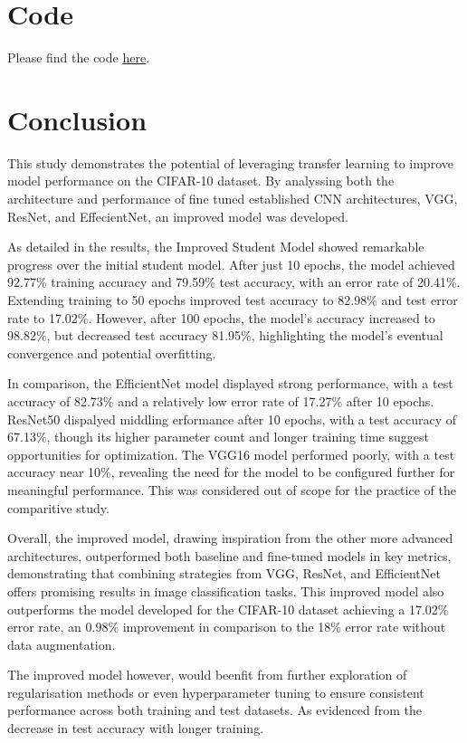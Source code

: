\documentclass[10pt,twocolumn,letterpaper]{article}
\begin{document}
\section{Code}
\label{sec:code}
Please find the code \href{https://github.com/Drackonack/DLF_Assignment_02}{here}.

\section{Conclusion}
\label{sec:conclusion}
This study demonstrates the potential of leveraging transfer learning to improve model performance on the CIFAR-10 dataset. By analyssing both the architecture and performance of fine tuned established CNN architectures, VGG, ResNet, and EffecientNet, an improved model was developed. 

As detailed in the results, the Improved Student Model showed remarkable progress over the initial student model. After just 10 epochs, the model achieved 92.77\% training accuracy and 79.59\% test accuracy, with an error rate of 20.41\%. Extending training to 50 epochs improved test accuracy to 82.98\% and test error rate to 17.02\%. However, after 100 epochs, the model’s accuracy increased to 98.82\%, but decreased test accuracy 81.95\%, highlighting the model's eventual convergence and potential overfitting.

In comparison, the EfficientNet model displayed strong performance, with a test accuracy of 82.73\% and a relatively low error rate of 17.27\% after 10 epochs. ResNet50 dispalyed middling erformance after 10 epochs, with a test accuracy of 67.13\%, though its higher parameter count and longer training time suggest opportunities for optimization. The VGG16 model performed poorly, with a test accuracy near 10\%, revealing the need for the model to be configured further for meaningful performance. This was considered out of scope for the practice of the comparitive study.

Overall, the improved model, drawing inspiration from the other more advanced architectures, outperformed both baseline and fine-tuned models in key metrics, demonstrating that combining strategies from VGG, ResNet, and EfficientNet offers promising results in image classification tasks. This improved model also outperforms the model developed for the CIFAR-10 dataset \cite{cifar10} achieving a 17.02\% error rate, an 0.98\% improvement in comparison to the 18\% error rate without data augmentation.

The improved model however, would beenfit from further exploration of regularisation methods or even hyperparameter tuning to ensure consistent performance across both training and test datasets. As evidenced from the decrease in test accuracy with longer training. 
\end{document}
